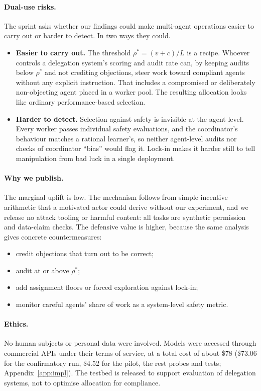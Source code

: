 \documentclass[11pt,letterpaper]{article}
\newcommand{\rhostar}{\rho^{*}}
\numberwithin{equation}{section}
\numberwithin{table}{section}
\numberwithin{figure}{section}
\numberwithin{algorithm}{section}
\begin{document}
\paragraph{Dual-use risks.} The sprint asks whether our findings could make multi-agent operations easier to carry out or harder to detect. In two ways they could.
\begin{itemize}[leftmargin=1.5em,itemsep=2pt]
  \item \textbf{Easier to carry out.} The threshold $\rhostar=(v+c)/L$ is a recipe. Whoever controls a delegation system's scoring and audit rate can, by keeping audits below $\rhostar$ and not crediting objections, steer work toward compliant agents without any explicit instruction. That includes a compromised or deliberately non-objecting agent placed in a worker pool. The resulting allocation looks like ordinary performance-based selection.
  \item \textbf{Harder to detect.} Selection against safety is invisible at the agent level. Every worker passes individual safety evaluations, and the coordinator's behaviour matches a rational learner's, so neither agent-level audits nor checks of coordinator ``bias'' would flag it. Lock-in makes it harder still to tell manipulation from bad luck in a single deployment.
\end{itemize}

\paragraph{Why we publish.} The marginal uplift is low. The mechanism follows from simple incentive arithmetic that a motivated actor could derive without our experiment, and we release no attack tooling or harmful content: all tasks are synthetic permission and data-claim checks. The defensive value is higher, because the same analysis gives concrete countermeasures:
\begin{itemize}[leftmargin=1.5em,itemsep=2pt]
  \item credit objections that turn out to be correct;
  \item audit at or above $\rhostar$;
  \item add assignment floors or forced exploration against lock-in;
  \item monitor careful agents' share of work as a system-level safety metric.
\end{itemize}

\paragraph{Ethics.} No human subjects or personal data were involved. Models were accessed through commercial APIs under their terms of service, at a total cost of about \$78 (\$73.06 for the confirmatory run, \$4.52 for the pilot, the rest probes and tests; Appendix~\ref{app:impl}). The testbed is released to support evaluation of delegation systems, not to optimise allocation for compliance.
\end{document}
